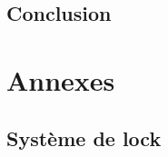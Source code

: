 \documentclass[11pt,a4paper,twoside]{book}
\renewcommand{\chaptermark}[1]{\markboth{Chapitre {\thechapter}. #1}{}}
\renewcommand \thechapter{\Roman{chapter}}
\begin{document}


\chapter*{Conclusion}\label{chapter:concl}

\part*{Annexes}
\appendix
\renewcommand{\chaptermark}[1]{\markboth{\appendixname\ \thechapter: #1}{}}
\chapter{Système de lock}\label{app:laserlock}
\renewcommand{\bibname}{References}
\printbibliography

\backmatter
\end{document}

